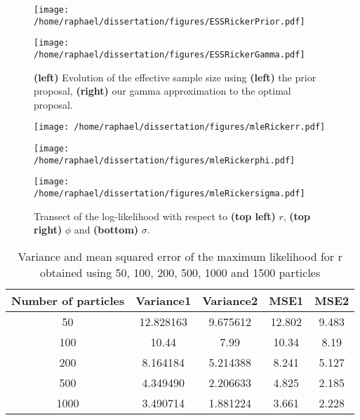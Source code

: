 \documentclass[12pt]{article}
\newcommand{\ra}[1]{\renewcommand{\arraystretch}{#1}}
\begin{document}
	\begin{figure}[htb]
		\centering
		\begin{minipage}{0.4\textwidth}
			\centering
			\texttt{[image: /home/raphael/dissertation/figures/ESSRickerPrior.pdf]}
		\end{minipage}
		\begin{minipage}{0.4\textwidth}
			\centering
			\texttt{[image: /home/raphael/dissertation/figures/ESSRickerGamma.pdf]}
		\end{minipage}
		\caption{\textbf{(left)} Evolution of the effective sample size using \textbf{(left)} the prior proposal, \textbf{(right)} our gamma approximation to the optimal proposal.}
		\label{fig:essRicker}
	\end{figure}
	
	\begin{figure}[htb]
		\centering
		\begin{minipage}{0.4\textwidth}
			\centering
			\texttt{[image: /home/raphael/dissertation/figures/mleRickerr.pdf]}
		\end{minipage}
		\begin{minipage}{0.4\textwidth}
			\centering
			\texttt{[image: /home/raphael/dissertation/figures/mleRickerphi.pdf]}
		\end{minipage}
		\begin{minipage}{0.4\textwidth}
			\centering
			\texttt{[image: /home/raphael/dissertation/figures/mleRickersigma.pdf]}
		\end{minipage}
		\caption{Transect of the log-likelihood with respect to \textbf{(top left)} $r$, \textbf{(top right)} $\phi$ and \textbf{(bottom)} $\sigma$.}
		\label{fig:transect}
	\end{figure}
	
	\begin{table}[htb]
		\centering
		\ra{1.3}
		\begin{tabular}{@{}ccccc@{}} \toprule
			Number of particles & Variance1 &  Variance2 & MSE1 & MSE2 \\ \midrule
			50 & 12.828163 &  9.675612 & 12.802 & 9.483\\ 
			100 & 10.44 & 7.99 & 10.34 & 8.19\\ 
			200 & 8.164184 & 5.214388 &  8.241 & 5.127\\ 
			500 & 4.349490 & 2.206633 & 4.825 & 2.185\\ 
			1000 & 3.490714 & 1.881224 & 3.661  & 2.228\\  \bottomrule
		\end{tabular}
		\caption{Variance and mean squared error of the maximum likelihood for r obtained using 50, 100, 200, 500, 1000 and 1500 particles}
		\label{table:mleR}
	\end{table}
\end{document}
